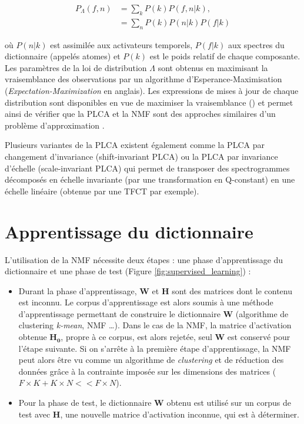 \begin{align}
P_{\Lambda}\left(f,n\right) &= \sum_k P\left( k \right)P\left(f, n\vert k \right),\\
& = \sum_n P(k)P \left(n \vert k\right)P\left(f \vert k \right)
\end{align}

où $P\left( n \vert k \right)$ est assimilée aux activateurs temporels, $P\left(f \vert k \right)$ aux spectres du dictionnaire (appelés atomes) et $P\left(k \right)$ est le poids relatif de chaque composante. Les paramètres de la loi de distribution $\Lambda$ sont obtenus en maximisant la vraisemblance des observations par un algorithme d'{Esperance-Maximisation} (\textit{Expectation-Maximization} en anglais). Les expressions de mises à jour de chaque distribution sont disponibles en vue de maximiser la vraisemblance (\cite{shashanka_probabilistic_2008}) et permet ainsi de vérifier que la PLCA et la NMF sont des approches similaires d'un problème d'approximation \cite{gaussier_relation_2005}.

Plusieurs variantes de la PLCA existent également comme la PLCA par changement d'invariance (shift-invariant PLCA) \cite{smaragdis_shift-invariant_2007} ou la PLCA par invariance d'échelle (scale-invariant PLCA) \cite{hennequin_scale-invariant_2011} qui permet de transposer des spectrogrammes décomposés en échelle invariante (par une transformation en Q-constant) en une échelle linéaire (obtenue par une TFCT par exemple).

\section{Apprentissage du dictionnaire}

L'utilisation de la NMF nécessite deux étapes : une phase d'apprentissage du dictionnaire et une phase de test (Figure \ref{fig:supervised_learning}) :

\begin{itemize}
\item Durant la phase d'apprentissage, $\mathbf{W}$ et $\mathbf{H}$ sont des matrices dont le contenu est inconnu. Le corpus d'apprentissage est alors soumis à une méthode d'apprentissage permettant de construire le dictionnaire $\mathbf{W}$ (algorithme de clustering \textit{k-mean}, NMF \dots). Dans le cas de la NMF, la matrice d'activation obtenue $\mathbf{H_0}$, propre à ce corpus, est alors rejetée, seul $\mathbf{W}$ est conservé pour l'étape suivante. Si on s'arrête à la première étape d'apprentissage, la NMF peut alors être vu comme un algorithme de \textit{clustering} \cite{li2006relationships} et de réduction des données grâce à la contrainte imposée sur les dimensions des matrices ($F \times K + K \times N << F \times N$).
\item Pour la phase de test, le dictionnaire $\mathbf{W}$ obtenu est utilisé sur un corpus de test avec $\mathbf{H}$, une nouvelle matrice d'activation inconnue, qui est à déterminer.
\end{itemize}

